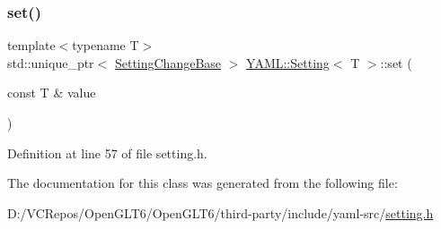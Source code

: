 \subsubsection{\texorpdfstring{set()}{set()}}
{\footnotesize\ttfamily template$<$typename T$>$ \\
std\+::unique\+\_\+ptr$<$ \mbox{\hyperlink{class_y_a_m_l_1_1_setting_change_base}{Setting\+Change\+Base}} $>$ \mbox{\hyperlink{class_y_a_m_l_1_1_setting}{Y\+A\+M\+L\+::\+Setting}}$<$ T $>$\+::set (\begin{DoxyParamCaption}\item[{const T \&}]{value }\end{DoxyParamCaption})\hspace{0.3cm}{\ttfamily [inline]}}



Definition at line 57 of file setting.\+h.



The documentation for this class was generated from the following file\+:\begin{DoxyCompactItemize}
\item 
D\+:/\+V\+C\+Repos/\+Open\+G\+L\+T6/\+Open\+G\+L\+T6/third-\/party/include/yaml-\/src/\mbox{\hyperlink{setting_8h}{setting.\+h}}\end{DoxyCompactItemize}
